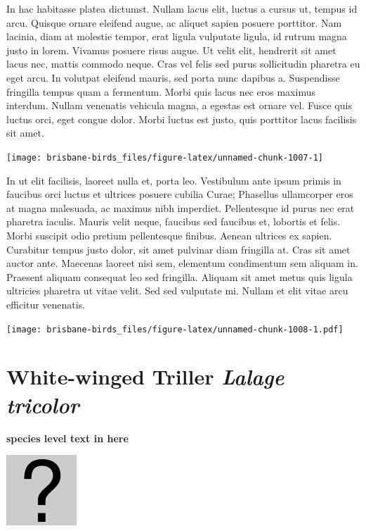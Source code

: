 \documentclass[]{book}
\let\origfigure\figure
\let\endorigfigure\endfigure
\renewenvironment{figure}[1][2] {
  \expandafter\origfigure\expandafter[H]
} {
  \endorigfigure
}
\begin{document}
In hac habitasse platea dictumst. Nullam lacus elit, luctus a cursus ut,
tempus id arcu. Quisque ornare eleifend augue, ac aliquet sapien posuere
porttitor. Nam lacinia, diam at molestie tempor, erat ligula vulputate
ligula, id rutrum magna justo in lorem. Vivamus posuere risus augue. Ut
velit elit, hendrerit sit amet lacus nec, mattis commodo neque. Cras vel
felis sed purus sollicitudin pharetra eu eget arcu. In volutpat eleifend
mauris, sed porta nunc dapibus a. Suspendisse fringilla tempus quam a
fermentum. Morbi quis lacus nec eros maximus interdum. Nullam venenatis
vehicula magna, a egestas est ornare vel. Fusce quis luctus orci, eget
congue dolor. Morbi luctus est justo, quis porttitor lacus facilisis sit
amet.

\begin{figure}
\texttt{[image: brisbane-birds\_files/figure-latex/unnamed-chunk-1007-1]} \caption{insert figure caption}\label{fig:unnamed-chunk-1007}
\end{figure}

In ut elit facilisis, laoreet nulla et, porta leo. Vestibulum ante ipsum
primis in faucibus orci luctus et ultrices posuere cubilia Curae;
Phasellus ullamcorper eros at magna malesuada, ac maximus nibh
imperdiet. Pellentesque id purus nec erat pharetra iaculis. Mauris velit
neque, faucibus sed faucibus et, lobortis et felis. Morbi suscipit odio
pretium pellentesque finibus. Aenean ultrices ex sapien. Curabitur
tempus justo dolor, sit amet pulvinar diam fringilla at. Cras sit amet
auctor ante. Maecenas laoreet nisi sem, elementum condimentum sem
aliquam in. Praesent aliquam consequat leo sed fringilla. Aliquam sit
amet metus quis ligula ultricies pharetra ut vitae velit. Sed sed
vulputate mi. Nullam et elit vitae arcu efficitur venenatis.

\begin{figure}
\centering
\texttt{[image: brisbane-birds\_files/figure-latex/unnamed-chunk-1008-1.pdf]}
\caption{\label{fig:unnamed-chunk-1008}insert figure caption}
\end{figure}

\section{\texorpdfstring{White-winged Triller \emph{Lalage
tricolor}}{White-winged Triller Lalage tricolor}}\label{white-winged-triller-lalage-tricolor}

\textbf{species level text in here}

\begin{figure}
\centering
\includegraphics{assets/missing.png}
\caption{No image for species}
\end{figure}
\end{document}
